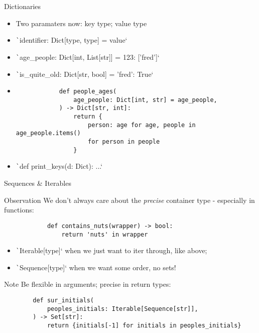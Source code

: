\documentclass[10pt]{beamer}
\begin{document}
\begin{frame}[fragile,shrink=10]{Dictionaries}
    \begin{itemize}[<+->]
        \item Two paramaters now: key type; value type
        \item \texttt`identifier: Dict[type, type] = value`
    \end{itemize}

    \pause\begin{examples}
    \begin{itemize}[<+->]
        \item \texttt`age_people: Dict[int, List[str]] = {123: ['fred']}`
        \item \texttt`is_quite_old: Dict[str, bool] = {'fred': True}`
        \item \begin{verbatim}
            def people_ages(
                age_people: Dict[int, str] = age_people,
            ) -> Dict[str, int]:
                return {
                    person: age for age, people in age_people.items()
                    for person in people
                }
        \end{verbatim}
        \item \texttt`def print_keys(d: Dict): ...`
    \end{itemize}
    \end{examples}
\end{frame}

\begin{frame}[fragile,shrink=10]{Sequences \& Iterables}
    \begin{block}{Observation}
        We don't always care about the \emph{precise} container type - especially in functions:
        \begin{verbatim}
            def contains_nuts(wrapper) -> bool:
                return 'nuts' in wrapper
        \end{verbatim}
    \end{block}

    \pause\begin{itemize}[<+->]
        \item \texttt`Iterable[type]` when we just want to iter through, like above;
        \item \texttt`Sequence[type]` when we want some order, no sets!
    \end{itemize}

    \pause\begin{alertblock}{Note}
        Be flexible in arguments; precise in return types:
        \begin{verbatim}
        def sur_initials(
            peoples_initials: Iterable[Sequence[str]],
        ) -> Set[str]:
            return {initials[-1] for initials in peoples_initials}
        \end{verbatim}
    \end{alertblock}
\end{frame}
\end{document}

